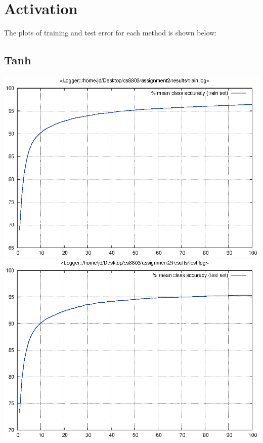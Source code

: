 \documentclass[twoside,12pt]{article}
\newcommand{\imsize}{0.5\linewidth}
\begin{document}
\section{Activation}
The plots of training and test error for each method is shown below:

\subsection{Tanh}
\includegraphics[width=\imsize]{assignment2/results/tanh_train}
\includegraphics[width=\imsize]{assignment2/results/tanh_test}
\end{document}
